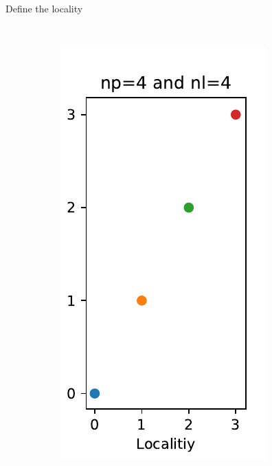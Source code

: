 \documentclass[\classoption]{beamer}
\begin{document}
\begin{frame}[fragile]{Define the locality}
\begin{figure}
\begin{subfigure}[b]{0.3\textwidth}
    \end{subfigure}
    ~ %
    \begin{subfigure}[b]{0.3\textwidth}
        \includegraphics[width=\textwidth]{./images/partition3}
    \end{subfigure}
\end{figure}

\end{frame}
\end{document}
